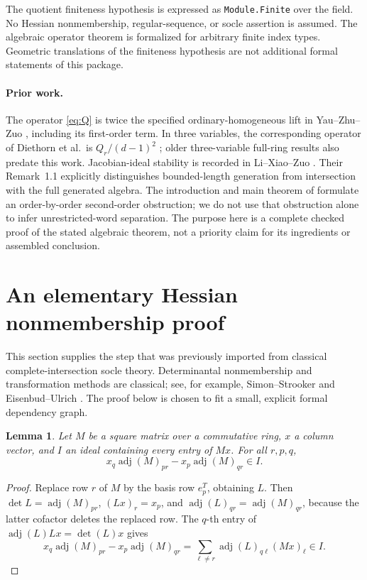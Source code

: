 \documentclass[11pt,letterpaper]{article}
\newtheorem{lemma}[theorem]{Lemma}
\DeclareMathOperator{\adj}{adj}
\begin{document}
The quotient finiteness hypothesis is expressed as \texttt{Module.Finite}
over the field. No Hessian nonmembership,
regular-sequence, or socle assertion is assumed. The algebraic operator theorem
is formalized for arbitrary finite index types. Geometric translations of the
finiteness hypothesis are not additional formal statements of this package.

\paragraph{Prior work.}
The operator \eqref{eq:Q} is twice the specified ordinary-homogeneous lift in
Yau--Zhu--Zuo \cite[eqs.~(3.1), (3.3), (5.1), (5.6), Cor.~5.5]{YZZ}, including
its first-order term. In three variables, the corresponding operator of
Diethorn et al.\ is \(Q_r/(d-1)^2\)
\cite[Sections 4.1.3 and 4.5, eqs.~(33), (35), Theorem~4.5.1]{DJM}; older
three-variable full-ring results also predate this work. Jacobian-ideal
stability is recorded in Li--Xiao--Zuo \cite[Theorem~2.7]{LXZ}.
Their Remark~1.1 explicitly distinguishes bounded-length generation from
intersection with the full generated algebra. The introduction and main theorem
of \cite{YZZ} formulate an order-by-order second-order obstruction; we do not
use that obstruction alone to infer unrestricted-word separation.
The purpose here is a complete checked proof of the stated algebraic theorem,
not a priority claim for its ingredients or assembled conclusion.

\section{An elementary Hessian nonmembership proof}
This section supplies the step that was previously imported from classical
complete-intersection socle theory. Determinantal nonmembership and
transformation methods are classical; see, for example,
Simon--Strooker \cite[Propositions 1.2 and 2.1]{SS} and
Eisenbud--Ulrich \cite[Theorem~7.1]{EU}. The proof below is chosen to fit a small,
explicit formal dependency graph.

\begin{lemma}\label{lem:wedge}
Let \(M\) be a square matrix over a commutative ring, \(x\) a column vector,
and \(I\) an ideal containing every entry of \(Mx\). For all \(r,p,q\),
\[
 x_q\adj(M)_{pr}-x_p\adj(M)_{qr}\in I.
\]
\end{lemma}
\begin{proof}
Replace row \(r\) of \(M\) by the basis row \(e_p^T\), obtaining \(L\).
Then \(\det L=\adj(M)_{pr}\), \((Lx)_r=x_p\), and
\(\adj(L)_{qr}=\adj(M)_{qr}\), because the latter cofactor deletes the
replaced row. The \(q\)-th entry of \(\adj(L)Lx=\det(L)x\) gives
\[
 x_q\adj(M)_{pr}-x_p\adj(M)_{qr}
 =\sum_{\ell\ne r}\adj(L)_{q\ell}(Mx)_\ell\in I.
\]
\end{proof}
\end{document}
